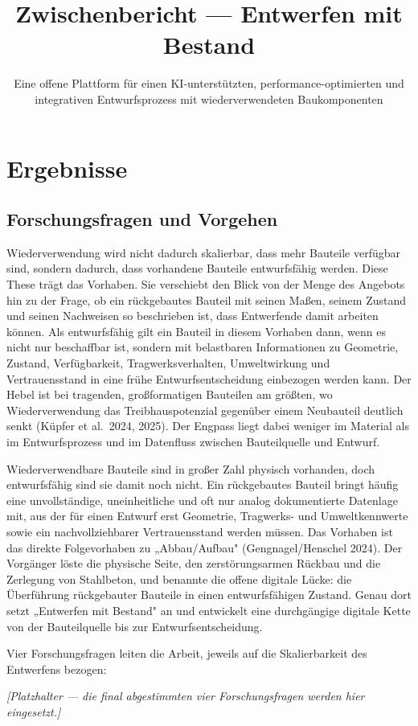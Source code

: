 \documentclass[type=zwischenbericht]{zukunftbau}
\title{Zwischenbericht --- Entwerfen mit Bestand}
\subtitle{Eine offene Plattform für einen KI-unterstützten, performance-optimierten und integrativen Entwurfsprozess mit wiederverwendeten Baukomponenten}
\begin{document}
\makecoverpages

\maketableofcontents


\section{Ergebnisse}

\subsection{Forschungsfragen und Vorgehen}

Wiederverwendung wird nicht dadurch skalierbar, dass mehr Bauteile verfügbar sind, sondern dadurch, dass vorhandene Bauteile entwurfsfähig werden. Diese These trägt das Vorhaben. Sie verschiebt den Blick von der Menge des Angebots hin zu der Frage, ob ein rückgebautes Bauteil mit seinen Maßen, seinem Zustand und seinen Nachweisen so beschrieben ist, dass Entwerfende damit arbeiten können. Als entwurfsfähig gilt ein Bauteil in diesem Vorhaben dann, wenn es nicht nur beschaffbar ist, sondern mit belastbaren Informationen zu Geometrie, Zustand, Verfügbarkeit, Tragwerksverhalten, Umweltwirkung und Vertrauensstand in eine frühe Entwurfsentscheidung einbezogen werden kann. Der Hebel ist bei tragenden, großformatigen Bauteilen am größten, wo Wiederverwendung das Treibhauspotenzial gegenüber einem Neubauteil deutlich senkt (Küpfer et al.\ 2024, 2025). Der Engpass liegt dabei weniger im Material als im Entwurfsprozess und im Datenfluss zwischen Bauteilquelle und Entwurf.

Wiederverwendbare Bauteile sind in großer Zahl physisch vorhanden, doch entwurfsfähig sind sie damit noch nicht. Ein rückgebautes Bauteil bringt häufig eine unvollständige, uneinheitliche und oft nur analog dokumentierte Datenlage mit, aus der für einen Entwurf erst Geometrie, Tragwerks- und Umweltkennwerte sowie ein nachvollziehbarer Vertrauensstand werden müssen. Das Vorhaben ist das direkte Folgevorhaben zu „Abbau/Aufbau" (Gengnagel/Henschel 2024). Der Vorgänger löste die physische Seite, den zerstörungsarmen Rückbau und die Zerlegung von Stahlbeton, und benannte die offene digitale Lücke: die Überführung rückgebauter Bauteile in einen entwurfsfähigen Zustand. Genau dort setzt „Entwerfen mit Bestand" an und entwickelt eine durchgängige digitale Kette von der Bauteilquelle bis zur Entwurfsentscheidung.

Vier Forschungsfragen leiten die Arbeit, jeweils auf die Skalierbarkeit des Entwerfens bezogen:

\begin{Blockquote}
\textit{[Platzhalter --- die final abgestimmten vier Forschungsfragen werden hier eingesetzt.]}
\end{Blockquote}
\end{document}
